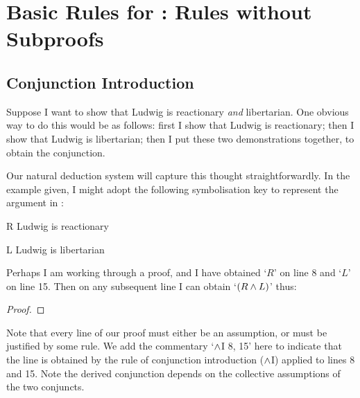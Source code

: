 \chapter{Basic Rules for \textnormal{\TFL}: Rules without Subproofs}\label{s:BasicTFLns}


\section{Conjunction Introduction}\label{conjint}
Suppose I want to show that Ludwig is reactionary \emph{and} libertarian. One obvious way to do this would be as follows: first I show that Ludwig is reactionary; then I show that Ludwig is libertarian; then I put these two demonstrations together, to obtain the conjunction.

Our natural deduction system will capture this thought straightforwardly. In the example given, I might adopt the following symbolisation key to represent the argument in \TFL:
	\begin{ekey}
		\item[R] Ludwig is reactionary
		\item[L] Ludwig is libertarian
	\end{ekey}
Perhaps I am working through a proof, and I have obtained `$R$' on line 8 and `$L$' on line 15. Then on any subsequent line I can obtain `$(R \wedge L)$' thus:
\begin{proof}
	 
\end{proof}
Note that every line of our proof must either be an assumption, or must be justified by some rule. We add the commentary `$\wedge$I 8, 15' here to indicate that the line is obtained by the rule of conjunction introduction ($\wedge$I) applied to lines 8 and 15. Note the derived conjunction depends on the collective assumptions of the two conjuncts.

